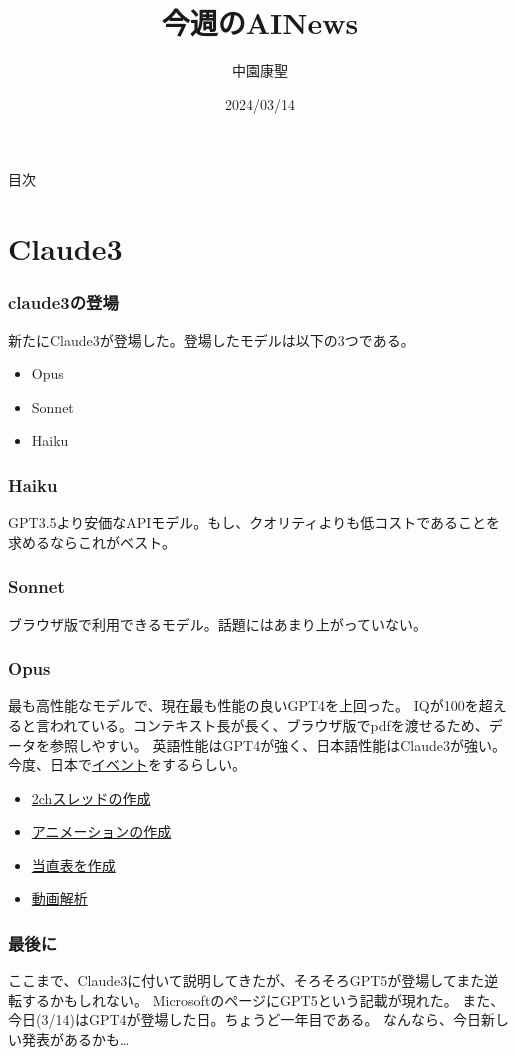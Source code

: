 \documentclass[dvipdfmx,12pt]{beamer}%
\title{今週のAINews}
\author{中園康聖}
\date{2024/03/14}
\begin{document}
\begin{frame}
\titlepage
\end{frame}
\begin{frame}{目次}
\tableofcontents
\end{frame}
\section{Claude3}
\begin{frame}
\frametitle{claude3の登場}
新たにClaude3が登場した。登場したモデルは以下の3つである。

\begin{itemize}
\item Opus
\item Sonnet
\item Haiku
\end{itemize}
\end{frame}

\begin{frame}
\frametitle{Haiku}
GPT3.5より安価なAPIモデル。もし、クオリティよりも低コストであることを求めるならこれがベスト。
\end{frame}

\begin{frame}
\frametitle{Sonnet}

ブラウザ版で利用できるモデル。話題にはあまり上がっていない。

\end{frame}


\begin{frame}
\frametitle{Opus}
最も高性能なモデルで、現在最も性能の良いGPT4を上回った。
IQが100を超えると言われている。コンテキスト長が長く、ブラウザ版でpdfを渡せるため、データを参照しやすい。
英語性能はGPT4が強く、日本語性能はClaude3が強い。今度、日本で\href{https://jawsug-ai.connpass.com/event/313318/}{イベント}をするらしい。
\begin{itemize}
\item \href{https://twitter.com/sou_btc/status/1767825425269666093?s=12&t=HWsH9aiIPwtM8W1pjX9WBA}{2chスレッドの作成}
\item \href{https://twitter.com/shi3z/status/1766765085488472306?s=12&t=HWsH9aiIPwtM8W1pjX9WBA}{アニメーションの作成}
\item \href{https://note.com/genkaijokyo/n/n186c061b7476}{当直表を作成}
\item \href{https://zenn.dev/olemi/articles/a8b492712fd9e7}{動画解析}
\end{itemize}
\end{frame}

\begin{frame}
\frametitle{最後に}
ここまで、Claude3に付いて説明してきたが、そろそろGPT5が登場してまた逆転するかもしれない。
MicrosoftのページにGPT5という記載が現れた。
また、今日(3/14)はGPT4が登場した日。ちょうど一年目である。
なんなら、今日新しい発表があるかも…
\end{frame}


\end{document}
